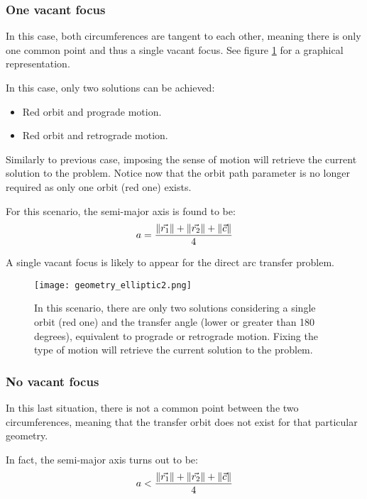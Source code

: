 \subsubsection{One vacant focus}
In this case, both circumferences are tangent to each other, meaning there is
only one common point and thus a single vacant focus. See figure
\ref{fig:elliptic_geometry_2} for a graphical representation.

In this case, only two solutions can be achieved:

\begin{itemize}
  \item Red orbit and prograde motion.
  \item Red orbit and retrograde motion.
\end{itemize}

Similarly to previous case, imposing the sense of motion will retrieve the
current solution to the problem. Notice now that the orbit path parameter is no
longer required as only one orbit (red one) exists.


For this scenario, the semi-major axis is found to be:
\begin{equation}
  a = \frac{\lVert\vec{r_{1}}\rVert + \lVert\vec{r_{2}}\rVert + \lVert\vec{c}\rVert}{4}
\end{equation}

A single vacant focus is likely to appear for the direct arc transfer problem.

\begin{figure}[H]
  \centering
  \texttt{[image: geometry\_elliptic2.png]}
  \caption{
    In this scenario, there are only two solutions considering a single orbit
    (red one) and the transfer angle (lower or greater than 180 degrees),
    equivalent to prograde or retrograde motion. Fixing the type of motion will retrieve the current solution to the problem.
  }
  \label{fig:elliptic_geometry_2}
\end{figure}


\subsubsection{No vacant focus}
In this last situation, there is not a common point between the two
circumferences, meaning that the transfer orbit does not exist for that
particular geometry.

In fact, the semi-major axis turns out to be:
\begin{equation}
  a < \frac{\lVert\vec{r_{1}}\rVert + \lVert\vec{r_{2}}\rVert + \lVert\vec{c}\rVert}{4}
\end{equation}

